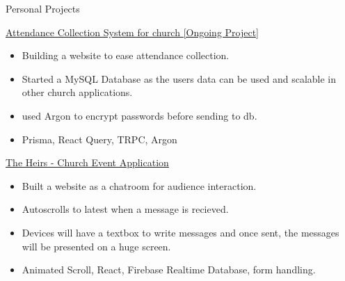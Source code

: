\documentclass{article}
\newlength{\tabin}
\newlength{\secsep}
\newcommand{\lineunder}{\vspace*{-8pt} \\ \hspace*{-6pt} \hrulefill \\ \vspace*{-15pt}}
\newenvironment{tabbedsection}[1]{
  \begin{list}{}{
      \setlength{\itemsep}{0pt}
      \setlength{\labelsep}{0pt}
      \setlength{\labelwidth}{0pt}
      \setlength{\leftmargin}{\tabin}
      \setlength{\rightmargin}{\tabin}
      \setlength{\listparindent}{0pt}
      \setlength{\parsep}{0pt}
      \setlength{\parskip}{0pt}
      \setlength{\partopsep}{0pt}
      \setlength{\topsep}{#1}
    }
  \item[]
}{\end{list}}
\newenvironment{resume_section}[1]{
  \filbreak
  \vspace{2\secsep}
  \textsc{\large#1}
  \lineunder
  \begin{tabbedsection}{\secsep}
}{\end{tabbedsection}}
\newenvironment{resume_subsection}[2][]{
  \textbf{#2} \hfill {\footnotesize #1} \hspace{2em}
  \begin{tabbedsection}{0.5\secsep}
}{\end{tabbedsection}}
\newenvironment{subitems}{
  \renewcommand{\labelitemi}{-}
  \begin{itemize}
      \setlength{\labelsep}{1em}
}{\end{itemize}}
\begin{document}
\begin{resume_section}{Personal Projects}

  \begin{resume_subsection}{\href{https://github.com/etcasual/cyc-attendance}{Attendance Collection System for church [Ongoing Project]}}
    \begin{subitems}
      \item Building a website to ease attendance collection.
      \item Started a MySQL Database as the users data can be used and scalable in other church applications.
      \item used Argon to encrypt passwords before sending to db.
      \item Prisma, React Query, TRPC, Argon
    \end{subitems}
  \end{resume_subsection}

  \vspace{\baselineskip}

  \begin{resume_subsection}[(March 2023)]{\href{https://github.com/etcasual/the-heirs}{The Heirs - Church Event Application}}
    \begin{subitems}
      \item Built a website as a chatroom for audience interaction.
      \item Autoscrolls to latest when a message is recieved.
      \item Devices will have a textbox to write messages and once sent, the messages will be presented on a huge screen.
      \item Animated Scroll, React, Firebase Realtime Database, form handling.
    \end{subitems}
  \end{resume_subsection}

  \vspace{\baselineskip}


\end{resume_section}
\end{document}
